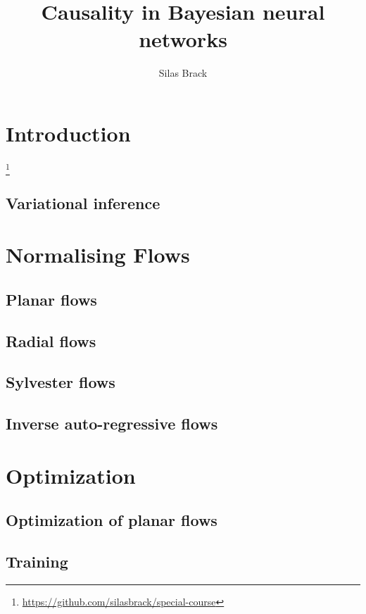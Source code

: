 \documentclass[10pt,a4paper,twocolumn]{article}
\title{\bfseries Causality in Bayesian neural networks}
\author{Silas Brack}
\begin{document}
\maketitle

\section{Introduction}

\textcite{wilson2020bayesian}
\footnote{\url{https://github.com/silasbrack/special-course}}

\subsection{Variational inference}

\section{Normalising Flows}\label{NF}

\subsection{Planar flows}

\subsection{Radial flows}

\subsection{Sylvester flows}\label{ssec:sylvester}

\subsection{Inverse auto-regressive flows}

\section{Optimization}\label{Ch:Opt}

\subsection{Optimization of planar flows}

\subsection{Training}
\end{document}
